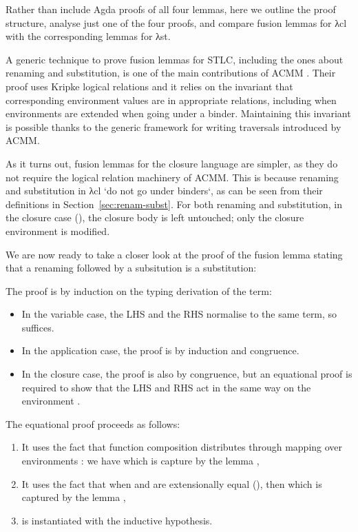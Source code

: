 \documentclass[bsc,frontabs,oneside,singlespacing,parskip,deptreport]{infthesis}
\theoremstyle{definition}
\begin{document}
Rather than include Agda proofs of all four lemmas, here we outline
the proof structure, analyse just one of the four proofs, and compare
fusion lemmas for λcl with the corresponding lemmas for λst.

A generic technique to prove fusion lemmas for STLC, including the
ones about renaming and substitution, is one of the main contributions
of ACMM \cite{DBLP:conf/cpp/Allais0MM17}. Their proof uses Kripke
logical relations and it relies on the invariant that corresponding
environment values are in appropriate relations, including when
environments are extended when going under a binder. Maintaining this
invariant is possible thanks to the generic framework for writing
traversals introduced by ACMM.

As it turns out, fusion lemmas for the closure language are simpler,
as they do not require the logical relation machinery of ACMM. This is
because renaming and substitution in λcl `do not go under binders`, as
can be seen from their definitions in
Section~\ref{sec:renam-subst}. For both renaming and substitution, in
the closure case (), the closure body is left untouched; only
the closure environment is modified.

We are now ready to take a closer look at the proof of the fusion
lemma stating that a renaming followed by a subsitution is a
substitution:


The proof is by induction on the typing derivation of the term:

\begin{itemize}
\item In the variable case, the LHS and the RHS normalise to the same
  term, so  suffices.
\item In the application case, the proof is by induction and
  congruence.
\item In the closure case, the proof is also by congruence, but an
  equational proof is required to show that the LHS and RHS act in the
  same way on the environment .
\end{itemize}

The equational proof proceeds as follows:

\begin{enumerate}[nolistsep]
\item It uses the fact that function composition 
  distributes through mapping over environments \AS{\_<\$>\_}: we have
   which is capture by the lemma
  ,
\item It uses the fact that when  and  are extensionally
  equal (), then  which
  is captured by the lemma ,
\item {} is instantiated with the inductive hypothesis.
\end{enumerate}
\end{document}
